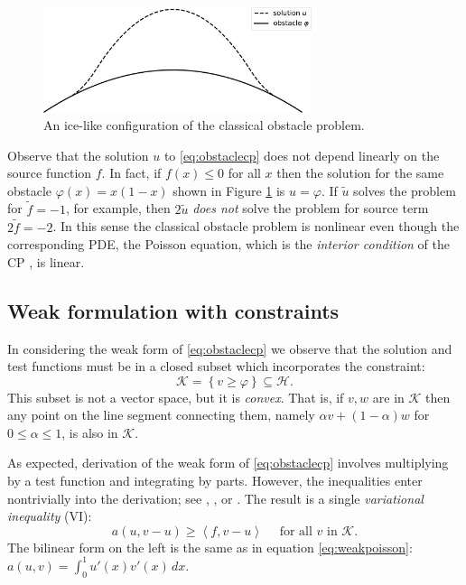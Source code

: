 \documentclass[letterpaper,final,12pt,reqno]{amsart}
\newcommand{\ip}[2]{\left<#1,#2\right>}
\numberwithin{equation}{section}
\numberwithin{figure}{section}
\numberwithin{table}{section}
\begin{document}
\begin{figure}
\includegraphics[width=0.7\textwidth]{fixfigs/icelike.pdf}
\caption{An ice-like configuration of the classical obstacle problem.}
\label{fig:icelike}
\end{figure}

Observe that the solution $u$ to \eqref{eq:obstaclecp} does not depend linearly on the source function $f$.  In fact, if $f(x)\le 0$ for all $x$ then the solution for the same obstacle $\varphi(x)=x(1-x)$ shown in Figure \ref{fig:icelike} is $u=\varphi$.  If $\tilde u$ solves the problem for $\tilde f= -1$, for example, then $2\tilde u$ \emph{does not} solve the problem for source term $2\tilde f = -2$.  In this sense the classical obstacle problem is nonlinear even though the corresponding PDE, the Poisson equation, which is the \emph{interior condition} of the CP \cite{KinderlehrerStampacchia1980}, is linear.

\subsection*{Weak formulation with constraints}  In considering the weak form of \eqref{eq:obstaclecp} we observe that the solution and test functions must be in a closed subset which incorporates the constraint:
\begin{equation}
\mathcal{K} = \left\{v \ge \varphi\right\} \subseteq \mathcal{H}.  \label{eq:Kdefine}
\end{equation}
This subset is not a vector space, but it is \emph{convex}.  That is, if $v,w$ are in $\mathcal{K}$ then any point on the line segment connecting them, namely $\alpha v + (1-\alpha) w$ for $0 \le \alpha \le 1$, is also in $\mathcal{K}$.  

As expected, derivation of the weak form of \eqref{eq:obstaclecp} involves multiplying by a test function and integrating by parts.  However, the inequalities enter nontrivially into the derivation; see \cite[Chapter 12]{Bueler2021}, \cite{JouvetBueler2012}, or \cite{KinderlehrerStampacchia1980}.  The result is a single \emph{variational inequality} (VI):
\begin{equation}
  a(u,v-u) \ge \ip{f}{v-u} \quad \text{ for all } v \text{ in } \mathcal{K}. \label{eq:obstaclevi}
\end{equation}
The bilinear form on the left is the same as in equation \eqref{eq:weakpoisson}: $a(u,v) = \int_0^1 u'(x) v'(x)\,dx$.
\end{document}
